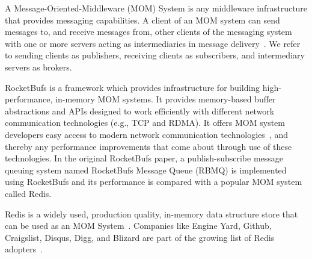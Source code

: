 \documentclass[letterpaper,twocolumn,10pt]{article}
\begin{document}
A Message-Oriented-Middleware (MOM) System is any middleware infrastructure that provides messaging capabilities.
A client of an MOM system can send messages to, and receive messages from, other clients of the messaging system with one or more servers acting as intermediaries in message delivery~\cite{doi:https://doi.org/10.1002/0470862084.ch1}.
We refer to sending clients as publishers, receiving clients as subscribers, and intermediary servers as brokers.

RocketBufs is a framework which provides infrastructure for building high-performance, in-memory MOM systems. It provides memory-based buffer abstractions and APIs designed to work efficiently with different network communication technologies (e.g., TCP and RDMA).
It offers MOM system developers easy access to modern network communication technologies~\cite{Rocketbufs}, and thereby any performance improvements that come about through use of these technologies.
In the original RocketBufs paper, a publish-subscribe message queuing system named RocketBufs Message Queue (RBMQ) is implemented using RocketBufs and its performance is compared with a popular MOM system called Redis.

Redis is a widely used, production quality, in-memory data structure store that can be used as an MOM System~\cite{redis-intro}. Companies like Engine Yard, Github, Craigslist, Disqus, Digg, and Blizard are part of the growing list of Redis adopters~\cite{macedo2011redis6}.

\end{document}
